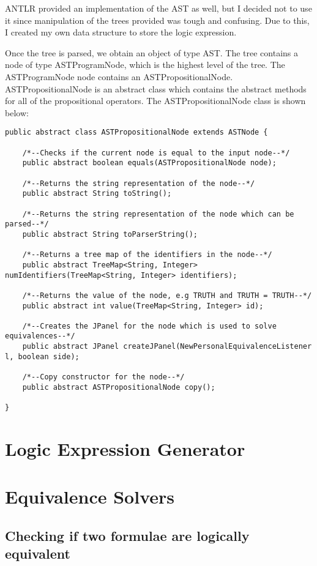 \documentclass{report}
\begin{document}
ANTLR provided an implementation of the AST as well, but I decided not to use it
since manipulation of the trees provided was tough and confusing. Due to this,
I created my own data structure to store the logic expression.

Once the tree is parsed, we obtain an object of type AST. The tree contains
a node of type ASTProgramNode, which is the highest level of the tree. The ASTProgramNode
node contains an ASTPropositionalNode. ASTPropositionalNode is an abstract class
which contains the abstract methods for all of the propositional operators. The
ASTPropositionalNode class is shown below:

\begin{verbatim}
public abstract class ASTPropositionalNode extends ASTNode {

	/*--Checks if the current node is equal to the input node--*/
	public abstract boolean equals(ASTPropositionalNode node);

	/*--Returns the string representation of the node--*/
	public abstract String toString();

	/*--Returns the string representation of the node which can be parsed--*/
	public abstract String toParserString();

	/*--Returns a tree map of the identifiers in the node--*/
	public abstract TreeMap<String, Integer> numIdentifiers(TreeMap<String, Integer> identifiers);
	
	/*--Returns the value of the node, e.g TRUTH and TRUTH = TRUTH--*/
	public abstract int value(TreeMap<String, Integer> id);

	/*--Creates the JPanel for the node which is used to solve equivalences--*/
	public abstract JPanel createJPanel(NewPersonalEquivalenceListener l, boolean side);
	
	/*--Copy constructor for the node--*/
	public abstract ASTPropositionalNode copy();

}
\end{verbatim}



\section{Logic Expression Generator}

\section{Equivalence Solvers}

\subsection{Checking if two formulae are logically equivalent}
\end{document}
